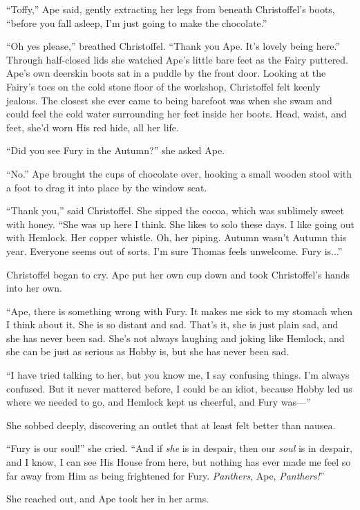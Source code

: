 \documentclass[11pt,a5paper]{article}
\begin{document}
``Toffy,'' Ape said, gently extracting her legs from beneath Christoffel's boots, ``before you fall asleep, I'm just going to make the chocolate.''

``Oh yes please,'' breathed Christoffel. ``Thank you Ape. It's lovely being here.'' Through half-closed lids she watched Ape's little bare feet as the Fairy puttered. Ape's own deerskin boots sat in a puddle by the front door. Looking at the Fairy's toes on the cold stone floor of the workshop, Christoffel felt keenly jealous. The closest she ever came to being barefoot was when she swam and could feel the cold water surrounding her feet inside her boots. Head, waist, and feet, she'd worn His red hide, all her life.

``Did you see Fury in the Autumn?'' she asked Ape.

``No.'' Ape brought the cups of chocolate over, hooking a small wooden stool with a foot to drag it into place by the window seat.

``Thank you,'' said Christoffel. She sipped the cocoa, which was sublimely sweet with honey. ``She was up here I think. She likes to solo these days. I like going out with Hemlock. Her copper whistle. Oh, her piping. Autumn wasn't Autumn this year. Everyone seems out of sorts. I'm sure Thomas feels unwelcome. Fury is...''

Christoffel began to cry. Ape put her own cup down and took Christoffel's hands into her own.

``Ape, there is something wrong with Fury. It makes me sick to my stomach when I think about it. She is so distant and sad. That's it, she is just plain sad, and she has never been sad. She's not always laughing and joking like Hemlock, and she can be just as serious as Hobby is, but she has never been sad.

``I have tried talking to her, but you know me, I say confusing things. I'm always confused. But it never mattered before, I could be an idiot, because Hobby led us where we needed to go, and Hemlock kept us cheerful, and Fury was---''

She sobbed deeply, discovering an outlet that at least felt better than nausea.

``Fury is our soul!'' she cried. ``And if \emph{she} is in despair, then our \emph{soul} is in despair, and I know, I can see His House from here, but nothing has ever made me feel so far away from Him as being frightened for Fury. \emph{Panthers}, Ape, \emph{Panthers!}''

She reached out, and Ape took her in her arms.
\end{document}
